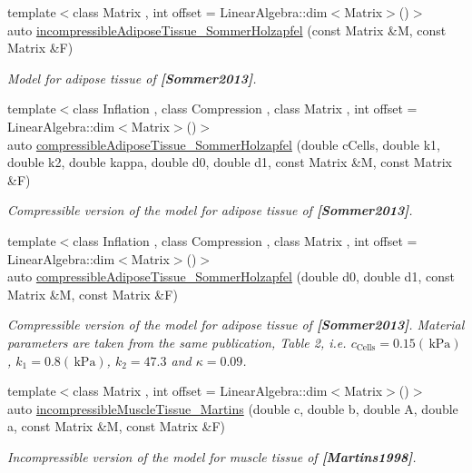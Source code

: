 \begin{DoxyCompactItemize}
{\footnotesize template$<$class Matrix , int offset = Linear\+Algebra\+::dim$<$\+Matrix$>$()$>$ }\\auto \hyperlink{group__Biomechanics_ga01ab128bcf179f4431b0270179af9e20}{incompressible\+Adipose\+Tissue\+\_\+\+Sommer\+Holzapfel} (const Matrix \&M, const Matrix \&F)
\begin{DoxyCompactList}\small\item\em Model for adipose tissue of {\bfseries [Sommer2013]}. \end{DoxyCompactList}\item 
{\footnotesize template$<$class Inflation , class Compression , class Matrix , int offset = Linear\+Algebra\+::dim$<$\+Matrix$>$()$>$ }\\auto \hyperlink{group__Biomechanics_ga5c3388564c0420b62e58f48c739d27f1}{compressible\+Adipose\+Tissue\+\_\+\+Sommer\+Holzapfel} (double c\+Cells, double k1, double k2, double kappa, double d0, double d1, const Matrix \&M, const Matrix \&F)
\begin{DoxyCompactList}\small\item\em Compressible version of the model for adipose tissue of {\bfseries [Sommer2013]}. \end{DoxyCompactList}\item 
{\footnotesize template$<$class Inflation , class Compression , class Matrix , int offset = Linear\+Algebra\+::dim$<$\+Matrix$>$()$>$ }\\auto \hyperlink{group__Biomechanics_ga27bb3f7c579ce8c21a69ea4d4d0169d7}{compressible\+Adipose\+Tissue\+\_\+\+Sommer\+Holzapfel} (double d0, double d1, const Matrix \&M, const Matrix \&F)
\begin{DoxyCompactList}\small\item\em Compressible version of the model for adipose tissue of {\bfseries [Sommer2013]}. Material parameters are taken from the same publication, Table 2, i.\+e. $c_\mathrm{Cells}=0.15 (\,\mathrm{kPa})$, $k_1=0.8 (\,\mathrm{kPa})$, $k_2=47.3$ and $\kappa=0.09$. \end{DoxyCompactList}\item 
{\footnotesize template$<$class Matrix , int offset = Linear\+Algebra\+::dim$<$\+Matrix$>$()$>$ }\\auto \hyperlink{group__Biomechanics_gafcc36a1958899ca9246c4c1b3c9bfd85}{incompressible\+Muscle\+Tissue\+\_\+\+Martins} (double c, double b, double A, double a, const Matrix \&M, const Matrix \&F)
\begin{DoxyCompactList}\small\item\em Incompressible version of the model for muscle tissue of {\bfseries [Martins1998]}. \end{DoxyCompactList}\item 

\end{DoxyCompactItemize}
